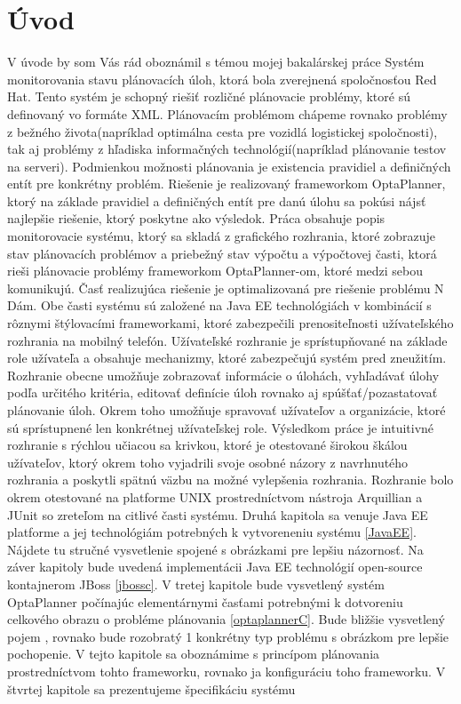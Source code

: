 

\chapter{Úvod}
V úvode by som Vás rád oboznámil s témou mojej bakalárskej práce Systém monitorovania stavu plánovacích úloh, ktorá bola zverejnená spoločnosťou Red Hat. Tento systém je schopný riešiť rozličné plánovacie problémy, ktoré sú definovaný vo formáte XML. Plánovacím problémom chápeme rovnako problémy z bežného života(napríklad optimálna cesta pre vozidlá logistickej spoločnosti), tak aj problémy z hľadiska informačných technológií(napríklad plánovanie testov na serveri). Podmienkou možnosti plánovania je existencia pravidiel a definičných entít pre konkrétny problém. Riešenie je realizovaný frameworkom OptaPlanner, ktorý na základe pravidiel a definičných entít pre danú úlohu sa pokúsi nájsť najlepšie riešenie, ktorý poskytne ako výsledok. Práca obsahuje popis monitorovacie systému, ktorý sa skladá z grafického rozhrania, ktoré zobrazuje stav plánovacích problémov a priebežný stav výpočtu a výpočtovej časti, ktorá rieši plánovacie problémy frameworkom OptaPlanner-om, ktoré medzi sebou komunikujú. Časť realizujúca riešenie je optimalizovaná pre riešenie problému N Dám. Obe časti systému sú založené na Java EE technológiách v kombinácií s rôznymi štýlovacími frameworkami, ktoré zabezpečili prenositeľnosti užívateľského rozhrania na mobilný telefón. Užívateľské rozhranie je sprístupňované na základe role užívateľa a obsahuje mechanizmy, ktoré zabezpečujú systém pred zneužitím. \newline \indent Rozhranie obecne umožňuje zobrazovať informácie o úlohách, vyhľadávať úlohy podľa určitého kritéria, editovať definície úloh rovnako aj spúšťať/pozastatovať plánovanie úloh. Okrem toho umožňuje spravovať užívateľov a organizácie, ktoré sú sprístupnené len konkrétnej užívateľskej role. Výsledkom práce je intuitivné rozhranie s rýchlou učiacou sa krivkou, ktoré je otestované širokou škálou užívateľov, ktorý okrem toho vyjadrili svoje osobné názory z navrhnutého rozhrania a poskytli spätnú väzbu na možné vylepšenia rozhrania. Rozhranie bolo okrem otestované na platforme UNIX prostredníctvom nástroja Arquillian a JUnit so zreteľom na citlivé časti systému. \newline \indent Druhá kapitola sa venuje Java EE platforme a jej technológiám potrebných k vytvoreneniu systému \ref{JavaEE}. Nájdete tu stručné vysvetlenie spojené s obrázkami pre lepšiu názornosť. Na záver kapitoly bude uvedená implementácii Java EE technológií open-source kontajnerom JBoss \ref{jbossc}. \newline \indent V tretej kapitole bude vysvetlený systém OptaPlanner počínajúc elementárnymi časťami potrebnými k dotvoreniu celkového obrazu o probléme plánovania \ref{optaplannerC}. Bude bližšie vysvetlený pojem , rovnako bude rozobratý 1 konkrétny typ problému s obrázkom pre lepšie pochopenie. V tejto kapitole sa oboznámime s princípom plánovania prostredníctvom tohto frameworku, rovnako ja konfiguráciu toho frameworku. \newline \indent V štvrtej kapitole sa prezentujeme špecifikáciu systému 